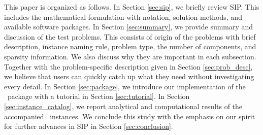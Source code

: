 
This paper is organized as follows. In Section \ref{sec:sip}, we briefly review SIP. This 
includes the mathematical formulation with notation, solution methods, and available software 
packages. In Section \ref{sec:summary}, we provide summary and discussion of the test 
problems. This consists of origin of the problems with brief description, instance naming 
rule, problem type, the number of components, and sparsity information. We also discuss why 
they are important in each subsection. Together with the problem-specific description given 
in Section \ref{sec:prob_desc}, we believe that users can quickly catch up what they need 
without investigating every detail. In Section \ref{sec:package}, we introduce our 
implementation of the \julia\ package with a tutorial in Section 
\ref{sec:tutorial}. In Section \ref{sec:instance_catalog}, we report analytical and 
computational results of the accompanied \smps\ instances. We conclude this study with the 
emphasis on our spirit for further advances in SIP in Section \ref{sec:conclusion}. 







